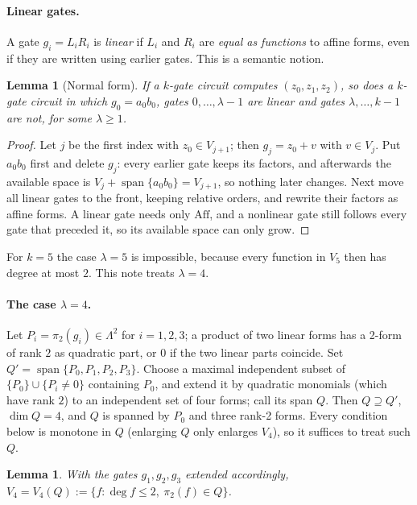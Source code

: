 \documentclass[11pt,a4paper]{article}
\theoremstyle{plain}
\newtheorem{lemma}[theorem]{Lemma}
\theoremstyle{definition}
\theoremstyle{remark}
\newcommand{\Aff}{\mathrm{Aff}}
\newcommand{\Span}{\operatorname{span}}
\newcommand{\Lam}{\Lambda^{2}}
\begin{document}
\paragraph{Linear gates.}
A gate $g_i=L_iR_i$ is \emph{linear} if $L_i$ and $R_i$ are \emph{equal as functions} to affine forms, even if they are written using earlier gates. This is a semantic notion.

\begin{lemma}[Normal form]\label{lem:normal}
If a $k$-gate circuit computes $(z_0,z_1,z_2)$, so does a $k$-gate circuit in which $g_0=a_0b_0$, gates $0,\dots,\lambda-1$ are linear and gates $\lambda,\dots,k-1$ are not, for some $\lambda\ge1$.
\end{lemma}

\begin{proof}
Let $j$ be the first index with $z_0\in V_{j+1}$; then $g_j=z_0+v$ with $v\in V_j$. Put $a_0b_0$ first and delete $g_j$: every earlier gate keeps its factors, and afterwards the available space is $V_j+\Span\{a_0b_0\}=V_{j+1}$, so nothing later changes. Next move all linear gates to the front, keeping relative orders, and rewrite their factors as affine forms. A linear gate needs only $\Aff$, and a nonlinear gate still follows every gate that preceded it, so its available space can only grow.
\end{proof}

For $k=5$ the case $\lambda=5$ is impossible, because every function in $V_5$ then has degree at most $2$. This note treats $\lambda=4$.

\paragraph{The case $\lambda=4$.}
Let $P_i=\pi_2(g_i)\in\Lam$ for $i=1,2,3$; a product of two linear forms has a 2-form of rank $2$ as quadratic part, or $0$ if the two linear parts coincide. Set $Q'=\Span\{P_0,P_1,P_2,P_3\}$. Choose a maximal independent subset of $\{P_0\}\cup\{P_i\ne0\}$ containing $P_0$, and extend it by quadratic monomials (which have rank $2$) to an independent set of four forms; call its span $Q$. Then $Q\supseteq Q'$, $\dim Q=4$, and $Q$ is spanned by $P_0$ and three rank-2 forms. Every condition below is monotone in $Q$ (enlarging $Q$ only enlarges $V_4$), so it suffices to treat such $Q$.

\begin{lemma}\label{lem:Qonly}
With the gates $g_1,g_2,g_3$ extended accordingly, $V_4=V_4(Q):=\{f:\deg f\le 2,\ \pi_2(f)\in Q\}$.
\end{lemma}
\end{document}
